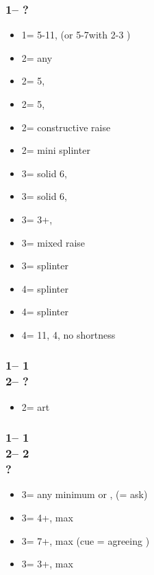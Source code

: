 \documentclass[12pt, a4paper]{article}
\begin{document}
\subsubsection*{1\spades -- ?}
\begin{itemize}
    \item 1\nt = 5-11\hcp, (or 5-7\hcp with 2-3 \spades)
    \item 2\clubs = any \gf
    \item 2\diams = 5\diams, \gf
    \item 2\hearts = 5\hearts, \gf
    \item 2\spades = constructive raise
    \item 2\nt = mini splinter
    \item 3\clubs = solid 6\clubs, \inv
    \item 3\diams = solid 6\diams, \inv
    \item 3\hearts = 3+\spades, \inv
    \item 3\spades = mixed raise
    \item 3\nt = splinter \hearts
    \item 4\clubs = splinter \clubs
    \item 4\diams = splinter \diams
    \item 4\hearts = 11\hcp, 4\spades, no shortness
\end{itemize}

\subsubsection*{1\hearts -- 1\spades\\
                2\hearts -- ?}
\begin{itemize}
    \item 2\nt = \invp art \vimp
\end{itemize}

\subsubsection*{1\hearts -- 1\spades\\
                2\hearts -- 2\nt\\
                ?}
\begin{itemize}
    \item 3\clubs = any minimum or \nat, \forc (\diams = ask) \vimp
    \item 3\diams = 4+\diams, max
    \item 3\hearts = 7+\hearts, max (cue = agreeing \hearts)
    \item 3\spades = 3+\spades, max
\end{itemize}
\end{document}
